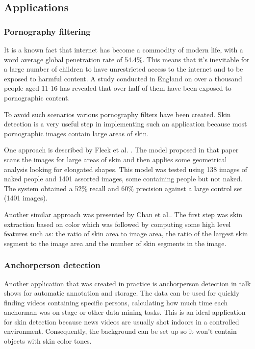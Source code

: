 \documentclass[12pt]{report}
\begin{document}
	\subsection{Applications}
	
	\subsubsection{Pornography filtering}
	It is a known fact that internet has become a commodity of modern life, with a word average global penetration rate of 54.4\%\cite{internet_stats}. This means that it's inevitable for a large number of children to have unrestricted access to the internet and to be exposed to harmful content. A study conducted in England\cite{children_exposure} on over a thousand people aged 11-16 has revealed that over half of them have been exposed to pornographic content. 
	
	To avoid such scenarios various pornography filters have been created. Skin detection is a very useful step in implementing such an application because most pornographic images contain large areas of skin.
	
	One approach is described by Fleck et al. \cite{finding_naked_people}. The model proposed in that paper scans the images for large areas of skin and then applies some geometrical analysis looking for elongated shapes. This model was tested using 138 images of naked people and 1401 assorted images, some containing people but not naked. The system obtained a 52\% recall and 60\% precision against a large control set (1401 images).
	
	Another similar approach was presented by Chan et al.\cite{pornography_filter_with_ratios}. The first step was skin extraction based on color which was followed by computing some high level features such as: the ratio of skin area to image area, the ratio of the largest skin segment to the image area and the number of skin segments in the image.
	
	\subsubsection{Anchorperson detection}
	Another application that was created in practice is anchorperson detection in talk shows \cite{anchor_person_detection} for automatic annotation and storage. The data can be used for quickly finding videos containing specific persons, calculating how much time each anchorman was on stage or other data mining tasks. This is an ideal application for skin detection because news videos are usually shot indoors in a controlled environment. Consequently, the background can be set up so it won't contain objects with skin color tones.
	
\end{document}
